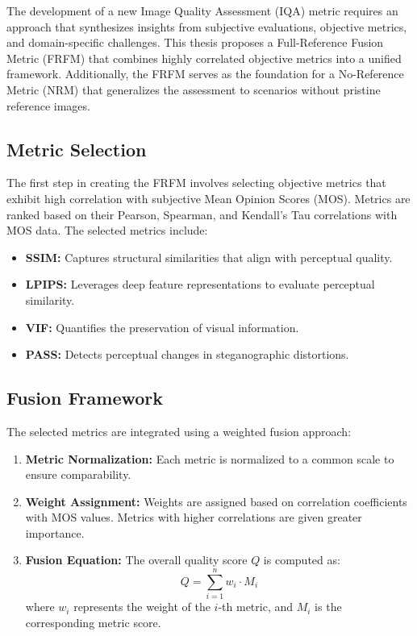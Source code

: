 The development of a new Image Quality Assessment (IQA) metric requires an approach that synthesizes insights from subjective evaluations, objective metrics, and domain-specific challenges. This thesis proposes a Full-Reference Fusion Metric (FRFM) that combines highly correlated objective metrics into a unified framework. Additionally, the FRFM serves as the foundation for a No-Reference Metric (NRM) that generalizes the assessment to scenarios without pristine reference images.

\subsection{Metric Selection}

The first step in creating the FRFM involves selecting objective metrics that exhibit high correlation with subjective Mean Opinion Scores (MOS). Metrics are ranked based on their Pearson, Spearman, and Kendall’s Tau correlations with MOS data. The selected metrics include:
\begin{itemize}
    \item \textbf{SSIM:} Captures structural similarities that align with perceptual quality.
    \item \textbf{LPIPS:} Leverages deep feature representations to evaluate perceptual similarity.
    \item \textbf{VIF:} Quantifies the preservation of visual information.
    \item \textbf{PASS:} Detects perceptual changes in steganographic distortions.
\end{itemize}

\subsection{Fusion Framework}

The selected metrics are integrated using a weighted fusion approach:
\begin{enumerate}
    \item \textbf{Metric Normalization:} Each metric is normalized to a common scale to ensure comparability.
    \item \textbf{Weight Assignment:} Weights are assigned based on correlation coefficients with MOS values. Metrics with higher correlations are given greater importance.
    \item \textbf{Fusion Equation:} The overall quality score \( Q \) is computed as:
    \[
    Q = \sum_{i=1}^{n} w_i \cdot M_i
    \]
    where \( w_i \) represents the weight of the \( i \)-th metric, and \( M_i \) is the corresponding metric score.
\end{enumerate}

